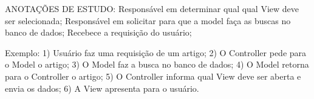 ANOTAÇÕES DE ESTUDO:
Responsável em determinar qual qual View deve ser selecionada;
Responsável em solicitar para que a model faça as buscas no banco de dados;
Recebece a requisição do usuário;

Exemplo:
1) Usuário faz uma requisição de um artigo;
2) O Controller pede para o Model o artigo;
3) O Model faz a busca no banco de dados;
4) O Model retorna para o Controller o artigo;
5) O Controller informa qual View deve ser aberta e envia os dados;
6) A View apresenta para o usuário.

